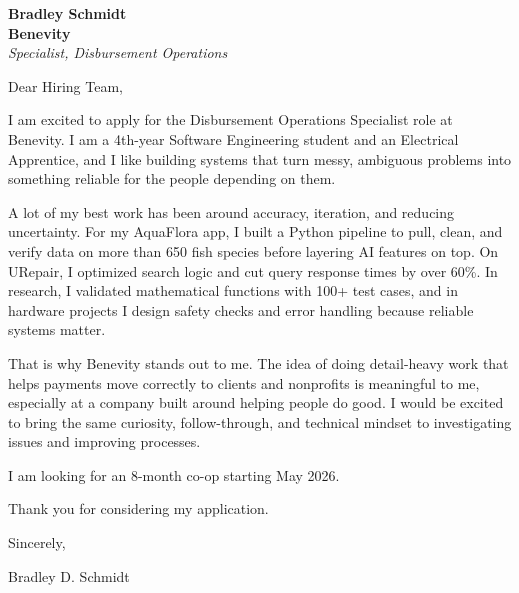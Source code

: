 \documentclass[11pt]{article}
\begin{document}
\textbf{Bradley Schmidt}\\
\vspace{0.5em}
\textbf{Benevity}\\
\textit{Specialist, Disbursement Operations}

Dear Hiring Team,

\par

I am excited to apply for the Disbursement Operations Specialist role at Benevity. I am a 4th-year Software Engineering student and an Electrical Apprentice, and I like building systems that turn messy, ambiguous problems into something reliable for the people depending on them.

\par

A lot of my best work has been around accuracy, iteration, and reducing uncertainty. For my AquaFlora app, I built a Python pipeline to pull, clean, and verify data on more than 650 fish species before layering AI features on top. On URepair, I optimized search logic and cut query response times by over 60\%. In research, I validated mathematical functions with 100+ test cases, and in hardware projects I design safety checks and error handling because reliable systems matter.

\par

That is why Benevity stands out to me. The idea of doing detail-heavy work that helps payments move correctly to clients and nonprofits is meaningful to me, especially at a company built around helping people do good. I would be excited to bring the same curiosity, follow-through, and technical mindset to investigating issues and improving processes.

\par

I am looking for an 8-month co-op starting May 2026.

\par

Thank you for considering my application.

\par

Sincerely,

\par

Bradley D. Schmidt
\end{document}
